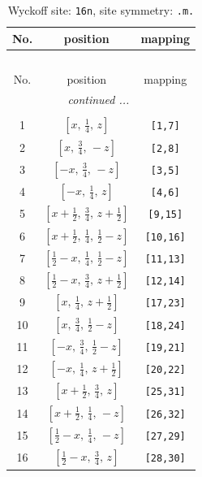 \documentclass[fleqn,8pt]{jsarticle}
\begin{document}
\renewcommand{\arraystretch}{1.2}
\begin{longtable}{ccc}
\caption{Wyckoff site: {\tt 16n}, site symmetry: {\tt .m.}}
 \\
 \hline \hline
No. & position & mapping \\ \hline \endfirsthead

\multicolumn{2}{l}{\tablename\ \thetable{}} \\
 \hline \hline
No. & position & mapping \\ \hline \endhead

 \hline \hline
\multicolumn{2}{r}{\footnotesize\it continued ...} \\ \endfoot

 \hline \hline
\multicolumn{2}{r}{} \\ \endlastfoot

1 & $\left[ x,\, \frac{1}{4},\, z \right]$ & {\tt [1,7]} \\ \hline
2 & $\left[ x,\, \frac{3}{4},\, - z \right]$ & {\tt [2,8]} \\ \hline
3 & $\left[ - x,\, \frac{3}{4},\, - z \right]$ & {\tt [3,5]} \\ \hline
4 & $\left[ - x,\, \frac{1}{4},\, z \right]$ & {\tt [4,6]} \\ \hline
5 & $\left[ x + \frac{1}{2},\, \frac{3}{4},\, z + \frac{1}{2} \right]$ & {\tt [9,15]} \\ \hline
6 & $\left[ x + \frac{1}{2},\, \frac{1}{4},\, \frac{1}{2} - z \right]$ & {\tt [10,16]} \\ \hline
7 & $\left[ \frac{1}{2} - x,\, \frac{1}{4},\, \frac{1}{2} - z \right]$ & {\tt [11,13]} \\ \hline
8 & $\left[ \frac{1}{2} - x,\, \frac{3}{4},\, z + \frac{1}{2} \right]$ & {\tt [12,14]} \\ \hline
9 & $\left[ x,\, \frac{1}{4},\, z + \frac{1}{2} \right]$ & {\tt [17,23]} \\ \hline
10 & $\left[ x,\, \frac{3}{4},\, \frac{1}{2} - z \right]$ & {\tt [18,24]} \\ \hline
11 & $\left[ - x,\, \frac{3}{4},\, \frac{1}{2} - z \right]$ & {\tt [19,21]} \\ \hline
12 & $\left[ - x,\, \frac{1}{4},\, z + \frac{1}{2} \right]$ & {\tt [20,22]} \\ \hline
13 & $\left[ x + \frac{1}{2},\, \frac{3}{4},\, z \right]$ & {\tt [25,31]} \\ \hline
14 & $\left[ x + \frac{1}{2},\, \frac{1}{4},\, - z \right]$ & {\tt [26,32]} \\ \hline
15 & $\left[ \frac{1}{2} - x,\, \frac{1}{4},\, - z \right]$ & {\tt [27,29]} \\ \hline
16 & $\left[ \frac{1}{2} - x,\, \frac{3}{4},\, z \right]$ & {\tt [28,30]} \\
\end{longtable}
\end{document}
